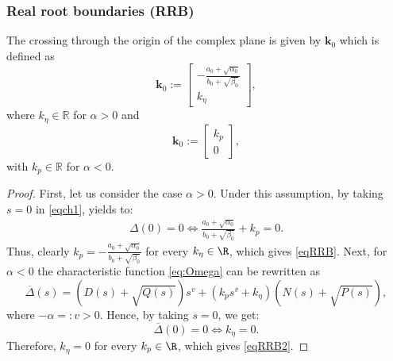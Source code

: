 \documentclass[twoside,reqno,11pt]{fcaa-var} %
\begin{document}
\subsubsection{Real root boundaries (RRB)}
\begin{proposition}\label{prop:RRB}
	The crossing through the origin of the complex plane is given by $\bm{k}_0$ which is defined as
	\begin{equation}
	\bm{k}_0:=\begin{bmatrix} -\frac{a_0+\sqrt{\alpha_0}}{b_0+\sqrt{\beta_0}}\\ k_\eta \end{bmatrix},\label{eqRRB}
	\end{equation}
	where $k_\eta\in\mathbb{R}$ for $\alpha>0$ and
	\begin{equation}
	\bm{k}_0:=\begin{bmatrix} k_p\\ 0 \end{bmatrix},\label{eqRRB2}
	\end{equation}
	with $k_p\in\mathbb{R}$ for $\alpha<0$.\par
	\begin{proof} 	
		First, let us consider the case $\alpha>0$. Under this assumption, by taking $s=0$ in \eqref{eqch1}, yields to:
		\begin{eqnarray}
		\Delta(0)=0 \iff \frac{a_0+\sqrt{\alpha_0}}{b_0+\sqrt{\beta_0}}+k_p=0.
		\end{eqnarray}
		Thus, clearly $k_p=-\frac{a_0+\sqrt{\alpha_0}}{b_0+\sqrt{\beta_0}}$ for every $k_\eta\in\R$, which gives \eqref{eqRRB}. Next, for $\alpha<0$ the characteristic function \eqref{eq:Omega} can be rewritten as
		\begin{equation}
		\overline{\Delta}(s)=(D(s)+\sqrt{Q(s)})s^v+(k_ps^v+k_\eta)(N(s)+\sqrt{P(s)}),\label{eqRRB3}
		\end{equation}
		where $-\alpha=:v>0$. Hence, by taking $s=0$, we get:%
		\begin{equation}
		\overline{\Delta}(0)=0 \iff k_\eta=0.
		\end{equation}
		Therefore, $k_\eta=0$ for every $k_p\in\R$, which gives \eqref{eqRRB2}.
	\end{proof}
\end{proposition}
\end{document}
